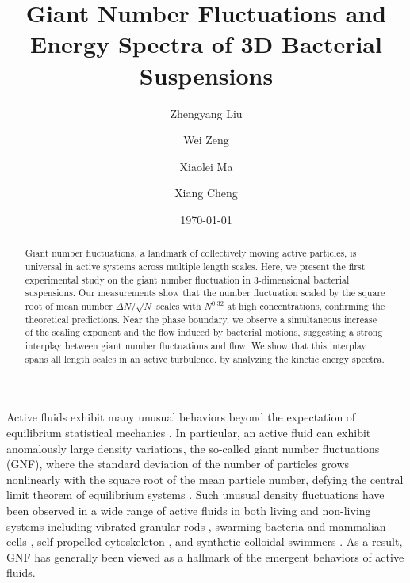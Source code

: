 \documentclass[twocolumn,aps,prl,amsmath,amssymb,longbibliography]{revtex4-2}
\begin{document}
\title{Giant Number Fluctuations and Energy Spectra of 3D Bacterial Suspensions}

\author{Zhengyang Liu}
\author{Wei Zeng}
\author{Xiaolei Ma}
\author{Xiang Cheng}



\date{\today}


\begin{abstract}
Giant number fluctuations, a landmark of collectively moving active particles, is universal in active systems across multiple length scales. Here, we present the first experimental study on the giant number fluctuation in 3-dimensional bacterial suspensions. Our measurements show that the number fluctuation scaled by the square root of mean number $\Delta N / \sqrt N$ scales with $N^{0.32}$ at high concentrations, confirming the theoretical predictions. Near the phase boundary, we observe a simultaneous increase of the scaling exponent and the flow induced by bacterial motions, suggesting a strong interplay between giant number fluctuations and flow. We show that this interplay spans all length scales in an active turbulence, by analyzing the kinetic energy spectra.

\end{abstract}

\maketitle

Active fluids exhibit many unusual behaviors beyond the expectation of equilibrium statistical mechanics \cite{Ramaswamy2010,Cates2012,Marchetti2013,Poon2013,Elgeti2015}.
In particular, an active fluid can exhibit anomalously large density variations, the so-called giant number fluctuations (GNF), where the standard deviation of the number of particles grows nonlinearly with the square root of the mean particle number, defying the central limit theorem of equilibrium systems \cite{Mishin2015}.
Such unusual density fluctuations have been observed in a wide range of active fluids in both living and non-living systems including vibrated granular rods \cite{Narayan2007,Aranson2008,Kudrolli2008,Deseigne2010},
swarming bacteria \cite{Zhang2010,Nishiguchi2017} and mammalian cells \cite{Kawaguchi2017},
self-propelled cytoskeleton \cite{Schaller2013}, and synthetic colloidal swimmers \cite{Palacci2013,Karani2019}. As a result, GNF has generally been viewed as a hallmark of the emergent behaviors of active fluids.
\end{document}

